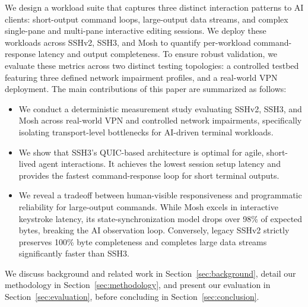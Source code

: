 We design a workload suite that captures three distinct interaction patterns to AI clients: short-output command loops, large-output data streams, and complex single-pane and multi-pane interactive editing sessions. We deploy these workloads across SSHv2, SSH3, and Mosh to quantify per-workload command-response latency and output completeness. To ensure robust validation, we evaluate these metrics across two distinct testing topologies: a controlled testbed featuring three defined network impairment profiles, and a real-world VPN deployment. The main contributions of this paper are summarized as follows:



\begin{itemize}
    \item We conduct a deterministic measurement study evaluating SSHv2, SSH3, and Mosh across real-world VPN and controlled network impairments, specifically isolating transport-level bottlenecks for AI-driven terminal workloads.
    
    \item We show that SSH3's QUIC-based architecture is optimal for agile, short-lived agent interactions. It achieves the lowest session setup latency and provides the fastest command-response loop for short terminal outputs.
    
    \item We reveal a tradeoff between human-visible responsiveness and programmatic reliability for large-output commands. While Mosh excels in interactive keystroke latency, its state-synchronization model drops over 98\% of expected bytes, breaking the AI observation loop. Conversely, legacy SSHv2 strictly preserves 100\% byte completeness and completes large data streams significantly faster than SSH3.
\end{itemize}

We discuss background and related work in Section~\ref{sec:background}, detail our methodology in Section~\ref{sec:methodology}, and present our evaluation in Section~\ref{sec:evaluation}, before concluding in Section~\ref{sec:conclusion}.
